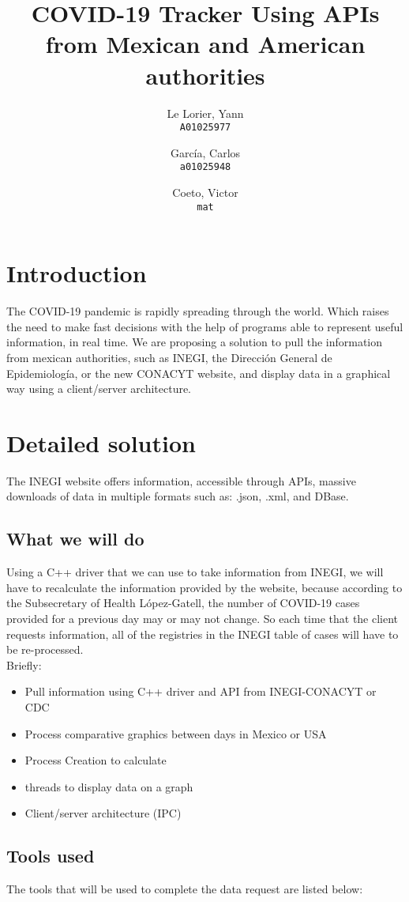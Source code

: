 \documentclass[12pt]{article}
\title{COVID-19 Tracker Using APIs from Mexican and American authorities}
\author{
	Le Lorier, Yann\\
	\texttt{A01025977}
	\and
	García, Carlos\\
	\texttt{a01025948}
	\and
	Coeto, Victor\\
	\texttt{mat}
}
\begin{document}
	\maketitle
	\tableofcontents

	\section{Introduction}
	The COVID-19 pandemic is rapidly spreading through the world. Which raises the need to make fast decisions with the help of programs able to represent useful information, in real time. We are proposing a solution to pull the information from mexican authorities, such as INEGI, the Dirección General de Epidemiología, or the new CONACYT website, and display data in a graphical way using a client/server architecture.

	\section{Detailed solution}
	The INEGI website offers information, accessible through APIs, massive downloads of data in multiple formats such as: .json, .xml, and DBase.

	\subsection{What we will do}
	Using a C++ driver that we can use to take information from INEGI, we will have to recalculate the information provided by the website, because according to the Subsecretary of Health López-Gatell, the number of COVID-19 cases provided for a previous day may or may not change. So each time that the client requests information, all of the registries in the INEGI table of cases will have to be re-processed.\\
	Briefly:
	\begin{itemize}
		\item Pull information using C++ driver and API from INEGI-CONACYT or CDC
		\item Process comparative graphics between days in Mexico or USA
		\item Process Creation to calculate
		\item threads to display data on a graph
		\item Client/server architecture (IPC)
	\end{itemize}

	\subsection{Tools used}
	The tools that will be used to complete the data request are listed below:
\end{document}
